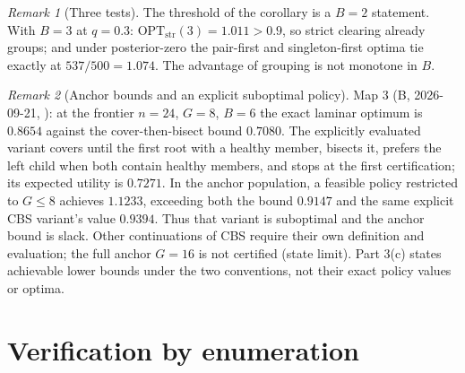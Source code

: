 \documentclass[11pt]{article}
\theoremstyle{remark}
\newtheorem{remark}{Remark}
\newcommand{\str}{\mathrm{str}}
\newcommand{\OPT}{\mathrm{OPT}}
\begin{document}
\begin{remark}[Three tests]
The threshold of the corollary is a $B=2$ statement. With $B=3$ at $q=0.3$: $\OPT_\str(3)=1.011>0.9$, so strict clearing already groups; and under posterior-zero the pair-first and singleton-first optima tie exactly at $537/500=1.074$. The advantage of grouping is not monotone in $B$.
\end{remark}

\begin{remark}[Anchor bounds and an explicit suboptimal policy]\label{rem:anchor}
Map 3 (B, 2026-09-21, ): at the frontier $n=24$, $G=8$, $B=6$ the exact laminar optimum is $0.8654$ against the cover-then-bisect bound $0.7080$. The explicitly evaluated variant covers until the first root with a healthy member, bisects it, prefers the left child when both contain healthy members, and stops at the first certification; its expected utility is $0.7271$. In the anchor population, a feasible policy restricted to $G\le8$ achieves $1.1233$, exceeding both the bound $0.9147$ and the same explicit CBS variant's value $0.9394$. Thus that variant is suboptimal and the anchor bound is slack. Other continuations of CBS require their own definition and evaluation; the full anchor $G=16$ is not certified (state limit). Part 3(c) states achievable lower bounds under the two conventions, not their exact policy values or optima.
\end{remark}

\section{Verification by enumeration}
\end{document}
